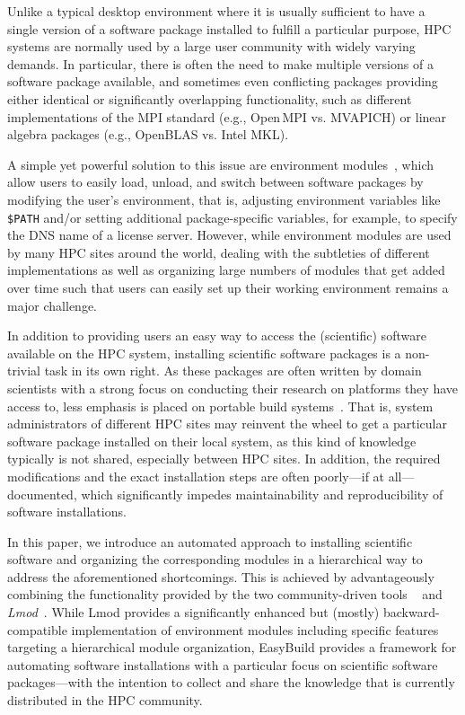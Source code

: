 Unlike a typical desktop environment where it is usually sufficient to have a
single version of a software package installed to fulfill a particular purpose, HPC
systems are normally used by a large user community with widely varying
demands. In particular, there is often the need to make multiple versions of
a software package available, and sometimes even conflicting packages
providing either identical or significantly overlapping functionality, such
as different implementations of the MPI standard (e.g., Open\,MPI vs.
MVAPICH) or linear algebra packages (e.g., OpenBLAS vs. Intel MKL).

A simple yet powerful solution to this issue are environment
modules~\cite{furlani91,furlani96,eadline,laytonEM1}, which allow
users to easily load, unload, and switch between software packages by
modifying the user's environment, that is, adjusting environment
variables like \texttt{\small\$PATH} and/or setting additional package-specific
variables, for example, to specify the DNS name of a
license server. However, while environment modules are used by many
HPC sites around the world, dealing with the subtleties of different
implementations as well as organizing large numbers of modules that
get added over time such that users can easily set up their working environment
remains a major challenge.

In addition to providing users an easy way to access the (scientific) software
available on the HPC system, installing scientific software packages is a
non-trivial task in its own right. As these packages are often written by domain
scientists with a strong focus on conducting their research on platforms
they have access to, less emphasis is placed on portable build
systems~\cite{Dubois03}. That
is, system administrators of different HPC sites may reinvent the wheel to
get a particular software package installed on their local system, as this
kind of knowledge typically is not shared, especially between HPC sites. In
addition, the required modifications and the exact installation steps are
often poorly---if at all---documented, which significantly impedes
maintainability and reproducibility of software installations.

In this paper, we introduce an automated approach to installing scientific
software and organizing the corresponding modules in a hierarchical way to
address the aforementioned shortcomings. This is achieved by advantageously
combining the functionality provided by the two community-driven tools
\emph{\easybuild{}}~\cite{EasyBuildSC12} and \emph{Lmod}~\cite{taccLmod}.
While Lmod provides a significantly enhanced but
(mostly) backward-compatible implementation of environment modules including specific
features targeting a hierarchical module organization, EasyBuild provides a
framework for automating software installations with a particular focus on
scientific software packages---with the intention to collect and share the
knowledge that is currently distributed in the HPC community.

